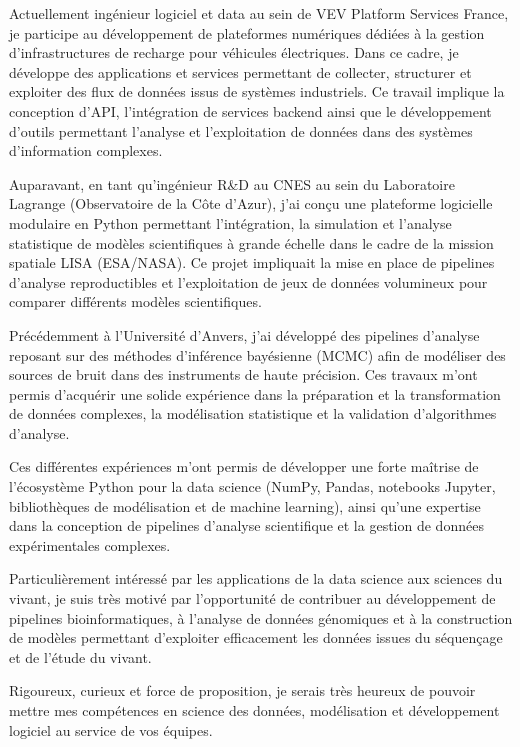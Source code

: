 \documentclass[10pt,a4paper]{../_shared/altacv}
\begin{document}
Actuellement ingénieur logiciel et data au sein de VEV Platform Services France, je participe au développement de plateformes numériques dédiées à la gestion d’infrastructures de recharge pour véhicules électriques. Dans ce cadre, je développe des applications et services permettant de collecter, structurer et exploiter des flux de données issus de systèmes industriels. Ce travail implique la conception d’API, l’intégration de services backend ainsi que le développement d’outils permettant l’analyse et l’exploitation de données dans des systèmes d’information complexes.

Auparavant, en tant qu’ingénieur R\&D au CNES au sein du Laboratoire Lagrange (Observatoire de la Côte d’Azur), j’ai conçu une plateforme logicielle modulaire en Python permettant l’intégration, la simulation et l’analyse statistique de modèles scientifiques à grande échelle dans le cadre de la mission spatiale LISA (ESA/NASA). Ce projet impliquait la mise en place de pipelines d’analyse reproductibles et l’exploitation de jeux de données volumineux pour comparer différents modèles scientifiques.

Précédemment à l’Université d’Anvers, j’ai développé des pipelines d’analyse reposant sur des méthodes d’inférence bayésienne (MCMC) afin de modéliser des sources de bruit dans des instruments de haute précision. Ces travaux m’ont permis d’acquérir une solide expérience dans la préparation et la transformation de données complexes, la modélisation statistique et la validation d’algorithmes d’analyse.

Ces différentes expériences m’ont permis de développer une forte maîtrise de l’écosystème Python pour la data science (NumPy, Pandas, notebooks Jupyter, bibliothèques de modélisation et de machine learning), ainsi qu’une expertise dans la conception de pipelines d’analyse scientifique et la gestion de données expérimentales complexes.

Particulièrement intéressé par les applications de la data science aux sciences du vivant, je suis très motivé par l’opportunité de contribuer au développement de pipelines bioinformatiques, à l’analyse de données génomiques et à la construction de modèles permettant d’exploiter efficacement les données issues du séquençage et de l’étude du vivant.

Rigoureux, curieux et force de proposition, je serais très heureux de pouvoir mettre mes compétences en science des données, modélisation et développement logiciel au service de vos équipes.
\end{document}
